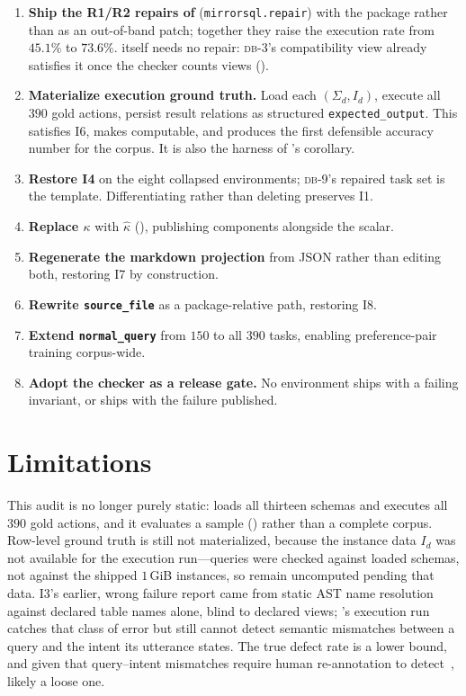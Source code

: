 \documentclass[11pt,letterpaper]{article}
\theoremstyle{definition}
\theoremstyle{plain}
\theoremstyle{remark}
\newcommand{\dbn}[1]{\textsc{db-#1}}
\newcommand{\code}[1]{\texttt{#1}}
\begin{document}
\begin{enumerate}[leftmargin=1.5em,itemsep=3pt,topsep=3pt]
  \item \textbf{Ship the R1/R2 repairs of } (\code{mirrorsql.repair}) with
        the package rather than as an out-of-band patch; together they raise the execution
        rate from $45.1\%$ to $73.6\%$.  itself needs no repair: \dbn{3}'s
        compatibility view already satisfies it once the checker counts views ().
  \item \textbf{Materialize execution ground truth.} Load each $(\Sigma_d, I_d)$, execute all
        $390$ gold actions, persist result relations as structured \code{expected\_output}.
        This satisfies I6, makes  computable, and produces the first
        defensible accuracy number for the corpus. It is also the harness of
        's corollary.
  \item \textbf{Restore I4} on the eight collapsed environments; \dbn{9}'s repaired task set
        is the template. Differentiating rather than deleting preserves I1.
  \item \textbf{Replace $\kappa$} with $\hat{\kappa}$ (), publishing components
        alongside the scalar.
  \item \textbf{Regenerate the markdown projection} from JSON rather than editing both,
        restoring I7 by construction.
  \item \textbf{Rewrite \code{source\_file}} as a package-relative path, restoring I8.
  \item \textbf{Extend \code{normal\_query}} from $150$ to all $390$ tasks, enabling
        preference-pair training corpus-wide.
  \item \textbf{Adopt the checker as a release gate.} No environment ships with a failing
        invariant, or ships with the failure published.
\end{enumerate}

\section{Limitations}
\label{sec:limitations}

This audit is no longer purely static:  loads all thirteen schemas and
executes all $390$ gold actions, and it evaluates a sample () rather than a
complete corpus. Row-level ground truth is still not materialized, because the instance data
$I_d$ was not available for the execution run---queries were checked against loaded schemas,
not against the shipped $1$\,GiB instances, so  remain uncomputed pending
that data. I3's earlier, wrong failure report came from static AST name resolution against
declared table names alone, blind to declared views; 's execution run
catches that class of error but still cannot detect semantic mismatches between a query and
the intent its utterance states. The true defect rate is a lower bound, and given that
query--intent mismatches require human re-annotation to detect~\cite{jin2026broken}, likely a
loose one.
\end{document}
